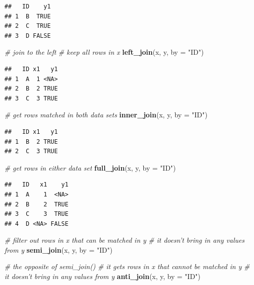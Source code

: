 \documentclass[12pt,]{krantz}
\makeatletter
\newenvironment{Shaded}{\begin{snugshade}}{\end{snugshade}}
\newcommand{\CommentTok}[1]{\textcolor[rgb]{0.37,0.37,0.37}{\textit{#1}}}
\newcommand{\DataTypeTok}[1]{\textcolor[rgb]{0.27,0.27,0.27}{#1}}
\newcommand{\KeywordTok}[1]{\textcolor[rgb]{0.27,0.27,0.27}{\textbf{#1}}}
\newcommand{\NormalTok}[1]{#1}
\newcommand{\StringTok}[1]{\textcolor[rgb]{0.5,0.5,0.5}{#1}}
\newenvironment{kframe}{%
\medskip{}
\setlength{\fboxsep}{.8em}
 \def\at@end@of@kframe{}%
 \ifinner\ifhmode%
  \def\at@end@of@kframe{\end{minipage}}%
  \begin{minipage}{\columnwidth}%
 \fi\fi%
 \def\FrameCommand##1{\hskip\@totalleftmargin \hskip-\fboxsep
 \colorbox{shadecolor}{##1}\hskip-\fboxsep
     \hskip-\linewidth \hskip-\@totalleftmargin \hskip\columnwidth}%
 \MakeFramed {\advance\hsize-\width
   \@totalleftmargin\z@ \linewidth\hsize
   \@setminipage}}%
 {\par\unskip\endMakeFramed%
 \at@end@of@kframe}
\renewenvironment{Shaded}{\begin{kframe}}{\end{kframe}}
\makeatother
\begin{document}
\begin{verbatim}
##   ID    y1
## 1  B  TRUE
## 2  C  TRUE
## 3  D FALSE
\end{verbatim}

\begin{Shaded}
\begin{Highlighting}[]
\CommentTok{# join to the left}
\CommentTok{# keep all rows in x}
\KeywordTok{left_join}\NormalTok{(x, y, }\DataTypeTok{by =} \StringTok{"ID"}\NormalTok{)}
\end{Highlighting}
\end{Shaded}

\begin{verbatim}
##   ID x1   y1
## 1  A  1 <NA>
## 2  B  2 TRUE
## 3  C  3 TRUE
\end{verbatim}

\begin{Shaded}
\begin{Highlighting}[]
\CommentTok{# get rows matched in both data sets}
\KeywordTok{inner_join}\NormalTok{(x, y, }\DataTypeTok{by =} \StringTok{"ID"}\NormalTok{)}
\end{Highlighting}
\end{Shaded}

\begin{verbatim}
##   ID x1   y1
## 1  B  2 TRUE
## 2  C  3 TRUE
\end{verbatim}

\begin{Shaded}
\begin{Highlighting}[]
\CommentTok{# get rows in either data set}
\KeywordTok{full_join}\NormalTok{(x, y, }\DataTypeTok{by =} \StringTok{"ID"}\NormalTok{)}
\end{Highlighting}
\end{Shaded}

\begin{verbatim}
##   ID   x1    y1
## 1  A    1  <NA>
## 2  B    2  TRUE
## 3  C    3  TRUE
## 4  D <NA> FALSE
\end{verbatim}

\begin{Shaded}
\begin{Highlighting}[]
\CommentTok{# filter out rows in x that can be matched in y }
\CommentTok{# it doesn't bring in any values from y }
\KeywordTok{semi_join}\NormalTok{(x, y, }\DataTypeTok{by =} \StringTok{"ID"}\NormalTok{)}
\end{Highlighting}
\end{Shaded}

\begin{Shaded}
\begin{Highlighting}[]
\CommentTok{# the opposite of  semi_join()}
\CommentTok{# it gets rows in x that cannot be matched in y}
\CommentTok{# it doesn't bring in any values from y}
\KeywordTok{anti_join}\NormalTok{(x, y, }\DataTypeTok{by =} \StringTok{"ID"}\NormalTok{)}
\end{Highlighting}
\end{Shaded}
\end{document}
